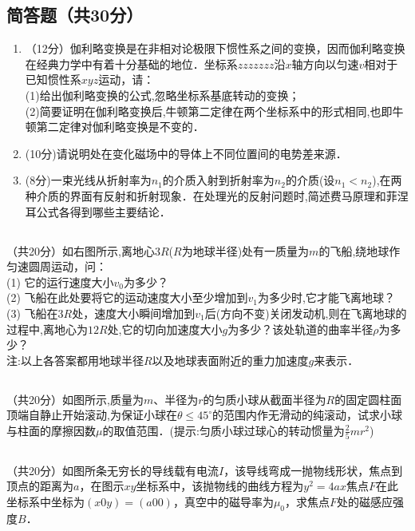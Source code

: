\subsection{简答题（共30分）}
\begin{enumerate}
\item （12分）伽利略变换是在非相对论极限下惯性系之间的变换，因而伽利略变换在经典力学中有着十分基础的地位．坐标系$zzzzzzz$沿$x$轴方向以匀速$v$相对于已知惯性系$xyz$运动，请：\\
(1)给出伽利略变换的公式,忽略坐标系基底转动的变换；\\
(2)简要证明在伽利略变换后,牛顿第二定律在两个坐标系中的形式相同,也即牛顿第二定律对伽利略变换是不变的．\\

\item (10分)请说明处在变化磁场中的导体上不同位置间的电势差来源．

\item (8分)一束光线从折射率为$n_{1}$的介质入射到折射率为$n_{2}$的介质(设$n_{1}<n_{2}$),在两种介质的界面有反射和折射现象．在处理光的反射问题时,简述费马原理和菲涅耳公式各得到哪些主要结论．
\end{enumerate}
\subsection{ }
（共20分）如右图所示,离地心$3R$($R$为地球半径)处有一质量为$m$的飞船,绕地球作匀速圆周运动，问：\\
(1) 它的运行速度大小$v_{0}$为多少？\\
(2) 飞船在此处要将它的运动速度大小至少增加到$v_{1}$为多少时,它才能飞离地球？\\
(3) 飞船在$3R$处，速度大小瞬间增加到$v_{1}$后(方向不变)关闭发动机,则在飞离地球的过程中,离地心为$12R$处,它的切向加速度大小$g$为多少？该处轨道的曲率半径$\rho$为多少？\\
注:以上各答案都用地球半径$R$以及地球表面附近的重力加速度$g$来表示．

\subsection{ }
（共20分）如图所示,质量为$m$、半径为$r$的匀质小球从截面半径为$R$的固定圆柱面顶端自静止开始滚动,为保证小球在$\theta \le 45^{\circ}$的范围内作无滑动的纯滚动，试求小球与柱面的摩擦因数$\mu$的取值范围．(提示:匀质小球过球心的转动惯量为$\frac{2}{5} mr^{2}$)

\subsection{ }
（共20分）如图所条无穷长的导线载有电流$I$，该导线弯成一抛物线形状，焦点到顶点的距离为$a$，在图示$xy$坐标系中，该抛物线的曲线方程为$y^{2}=4ax$焦点$F$在此坐标系中坐标为$(x0y)=(a00)$，真空中的磁导率为$\mu_{0}$，求焦点$F$处的磁感应强度$B$．

